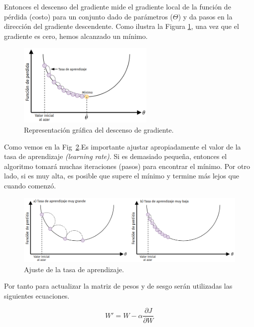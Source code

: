 \documentclass[a4paper,12pt]{article}
\begin{document}
Entonces el descenso del gradiente mide el gradiente local de la función de pérdida (costo) para un conjunto dado de parámetros ($\Theta$) y da pasos en la dirección del gradiente descendente. Como ilustra la Figura \ref{fig:gd}, una vez que el gradiente es cero, hemos alcanzado un mínimo.

\begin{figure}[H]
	\begin{center}				
		\includegraphics[width=0.58\textwidth]{023.png}
		\caption{Representación gráfica del descenso de gradiente.}
		\label{fig:gd}
	\end{center}
\end{figure}

Como vemos en la Fig~\ref{fig:lr}.Es importante ajustar apropiadamente el valor de la tasa de aprendizaje \textit{(learning rate)}. Si es demasiado pequeña, entonces el algoritmo tomará muchas iteraciones (pasos) para encontrar el mínimo. Por otro lado, si es muy alta, es posible que supere el mínimo y termine más lejos que cuando comenzó.

\begin{figure}[H]
	\begin{center}				
		\includegraphics[width=1\textwidth]{tesis_37.png}
		\caption{Ajuste de la tasa de aprendizaje.}
		\label{fig:lr}
	\end{center}
\end{figure}

Por tanto para actualizar la matriz de pesos y de sesgo serán utilizadas las siguientes ecuaciones.

\begin{equation}
	W' = W - \alpha \frac{\partial J}{\partial W}
\end{equation}
\end{document}
